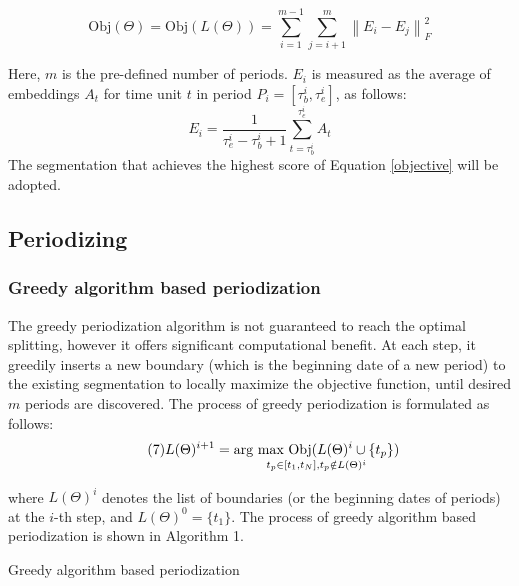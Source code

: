 \documentclass[output=paper]{langsci/langscibook}
\begin{document}
\begin{equation}\tag{5}
\text{Obj}(\Theta) = \text{Obj}(L(\Theta)) = \sum_{i = 1}^{m - 1} \sum_{j = i + 1}^{m}\left \| E_{i} - E_{j} \right \|_{F}^{2}
\label{objective}
\end{equation}

Here, $m$ is the pre-defined number of periods. $E_{i}$ is measured as the average of embeddings $A_{t}$ for time unit $t$ in period $P_{i} = [\tau_{b}^{i}, \tau_{e}^{i}]$, as follows:
\begin{equation}\tag{6}
E_{i} = \frac{1}{\tau_{e}^{i} - \tau_{b}^{i} + 1}\sum_{t = \tau_{b}^{i}}^{\tau_{e}^{i}}{A_{t}}
\label{period_embedding}
\end{equation}
The segmentation that achieves the highest score of Equation \eqref{objective} will be adopted.

\subsection{Periodizing}
\label{periodization_algorithms}

\subsubsection{Greedy algorithm based periodization}

The greedy periodization algorithm is not guaranteed to reach the optimal splitting, however it offers significant computational benefit. At each step, it greedily inserts a new boundary (which is the beginning date of a new period) to the existing segmentation to locally maximize the objective function, until desired $m$ periods are discovered. The process of greedy periodization is formulated as follows:
\begin{equation}\tag{7}
L(\Theta)^{i + 1} = \underset{t_{p} \in \left [ t_{1}, t_{N} \right ], t_{p} \notin L(\Theta)^{i}}{\textup{arg max}\ \text{Obj}(L(\Theta)^{i} \cup \left \{ t_{p} \right \})}
\label{greedy}
\end{equation}

where $L(\Theta)^{i}$ denotes the list of boundaries (or the beginning dates of periods) at the $i$-th step, and $L(\Theta)^{0} = \{t_{1}\}$. The process of greedy algorithm based periodization is shown in Algorithm 1.

\begin{algorithm}
\SetAlgoLined
{}
\caption{Greedy algorithm based periodization}
\end{algorithm}
\end{document}
